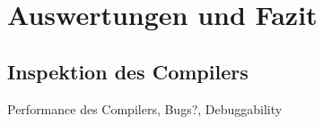 \part{Auswertungen und Fazit}
\chapter{Inspektion des Compilers}
\label{chap:fazit:results}

Performance des Compilers, Bugs?, Debuggability
